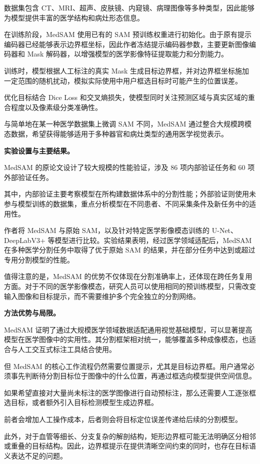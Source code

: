 \documentclass[10.5pt,compsoc]{CjC}
\theoremstyle{mystyle}
\begin{document}
数据集包含 CT、MRI、超声、皮肤镜、内窥镜、病理图像等多种类型，因此能够为模型提供丰富的医学结构和病灶形态信息。

在训练阶段，MedSAM 使用已有的 SAM 预训练权重进行初始化。由于原有提示编码器已经能够表示边界框坐标，因此作者冻结提示编码器参数，主要更新图像编码器和 Mask 解码器，以增强模型的医学影像特征提取能力和分割能力。

训练时，模型根据人工标注的真实 Mask 生成目标边界框，并对边界框坐标施加一定范围的随机扰动，模拟实际使用中用户框选目标时可能产生的位置误差。

优化目标结合 Dice Loss 和交叉熵损失，使模型同时关注预测区域与真实区域的重合程度以及像素级分类准确性。

与简单地在某一种医学数据集上微调 SAM 不同，MedSAM 通过整合大规模跨模态数据，希望获得能够适用于多种器官和病灶类型的通用医学视觉表示。

\noindent\textbf{实验设置与主要结果。}

MedSAM 的原论文设计了较大规模的性能验证，涉及 86 项内部验证任务和 60 项外部验证任务。

其中，内部验证主要考察模型在所构建数据体系中的分割性能；外部验证则使用未参与模型训练的数据集，重点分析模型在不同患者、不同采集条件及新任务中的适用性。

作者将 MedSAM 与原始 SAM，以及针对特定医学影像模态训练的 U-Net、DeepLabV3+ 等模型进行比较。实验结果表明，经过医学领域适配后，MedSAM 在多种医学分割任务中取得了优于原始 SAM 的结果，并在部分任务中达到或超过专用分割模型的性能。

值得注意的是，MedSAM 的优势不仅体现在分割准确率上，还体现在跨任务复用方面。对于不同的医学影像模态，研究人员可以使用相同的预训练模型，只需改变输入图像和目标提示，而不需要维护多个完全独立的分割网络。

\noindent\textbf{方法优势与局限。}

MedSAM 证明了通过大规模医学领域数据适配通用视觉基础模型，可以显著提高模型在医学图像中的实用性。其分割框架相对统一，能够覆盖多种成像模态，也适合与人工交互式标注工具结合使用。

但 MedSAM 的核心工作流程仍然需要位置提示，尤其是目标边界框。用户通常必须事先判断待分割目标位于图像中的什么位置，再通过框选向模型提供空间信息。

如果希望直接对大量尚未标注的医学图像进行自动预标注，那么还需要人工逐张框选目标，或者额外引入目标检测模型生成边界框。

前者会增加人工操作成本，后者则会将目标定位误差传递给后续的分割模型。

此外，对于血管等细长、分支复杂的解剖结构，矩形边界框可能无法明确区分相邻或重叠的目标结构。因此，边界框提示在提供清晰空间约束的同时，也存在目标语义表达不足的问题。
\end{document}

